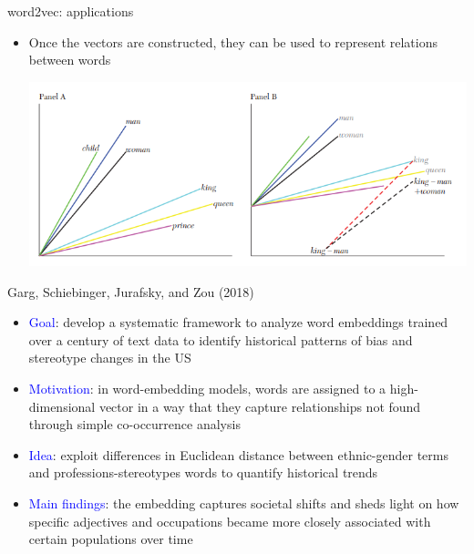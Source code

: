 \documentclass[usenames,dvipsnames,english]{beamer}
\begin{document}
\begin{frame}{word2vec: applications}

    \begin{itemize}
        \setlength{\itemsep}{1em}
        
        \item Once the vectors are constructed, they can be used to represent relations between words
        \begin{center}
    \includegraphics[scale=0.6]{Images/we_gentzkow.png}
    \end{center}
    \end{itemize}
    
\end{frame}
\begin{frame}{Garg, Schiebinger, Jurafsky, and Zou (2018)}
\begin{itemize}
\setlength{\itemsep}{1.2em}
    \item \textcolor{blue}{Goal}: develop a systematic framework to analyze word embeddings trained over a century of text data to identify historical patterns of bias and stereotype changes in the US
    \item \textcolor{blue}{Motivation}: in word-embedding models, words are assigned to a high-dimensional vector in a way that they capture relationships not found through simple co-occurrence analysis
    \item \textcolor{blue}{Idea}: exploit differences in Euclidean distance between ethnic-gender terms and professions-stereotypes words to quantify historical trends
    \item \textcolor{blue}{Main findings}: the embedding captures societal shifts and sheds light on how specific adjectives and occupations became more closely associated with certain populations over time
\end{itemize}
\end{frame}
\end{document}
